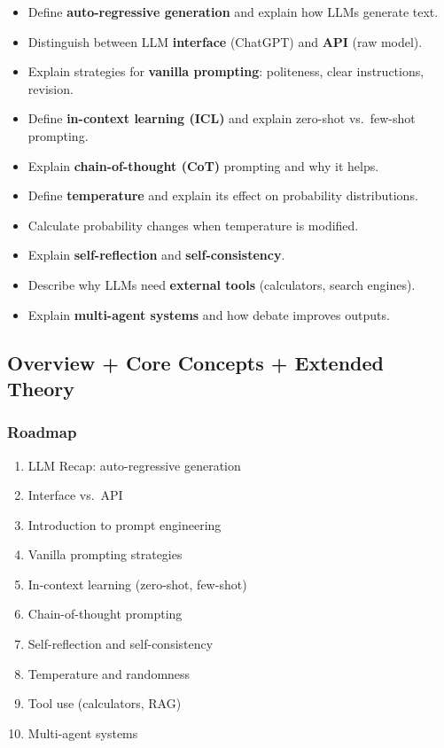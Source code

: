 \begin{itemize}
  \item Define \textbf{auto-regressive generation} and explain how LLMs generate text.
  \item Distinguish between LLM \textbf{interface} (ChatGPT) and \textbf{API} (raw model).
  \item Explain strategies for \textbf{vanilla prompting}: politeness, clear instructions, revision.
  \item Define \textbf{in-context learning (ICL)} and explain zero-shot vs.\ few-shot prompting.
  \item Explain \textbf{chain-of-thought (CoT)} prompting and why it helps.
  \item Define \textbf{temperature} and explain its effect on probability distributions.
  \item Calculate probability changes when temperature is modified.
  \item Explain \textbf{self-reflection} and \textbf{self-consistency}.
  \item Describe why LLMs need \textbf{external tools} (calculators, search engines).
  \item Explain \textbf{multi-agent systems} and how debate improves outputs.
\end{itemize}

\bigseparator

\subsection{Overview + Core Concepts + Extended Theory}

\subsubsection*{Roadmap}
\begin{enumerate}
  \item LLM Recap: auto-regressive generation
  \item Interface vs.\ API
  \item Introduction to prompt engineering
  \item Vanilla prompting strategies
  \item In-context learning (zero-shot, few-shot)
  \item Chain-of-thought prompting
  \item Self-reflection and self-consistency
  \item Temperature and randomness
  \item Tool use (calculators, RAG)
  \item Multi-agent systems
\end{enumerate}

